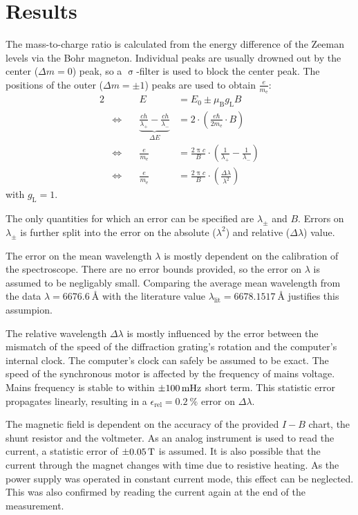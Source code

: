 \chapter{Results}
The mass-to-charge ratio is calculated from the energy difference of the Zeeman levels via the Bohr magneton.
Individual peaks are usually drowned out by the center ($\Delta m = 0$) peak, so a $\upsigma$-filter is used to block the center peak.
The positions of the outer ($\Delta m = \pm 1$) peaks are used to obtain $\frac{e}{m_\text{e}}$:
\begin{alignat}{2}
	& &E &= E_0 \pm \mu_\text{B} g_\text{L} B\\
	&\Leftrightarrow \quad &\underbrace{\frac{c h}{\lambda_+} - \frac{c h}{\lambda_-}}_{\Delta E} &=
	2 \cdot \left(\frac{e \hbar}{2 m_\text{e}} \cdot B \right)\\
	&\Leftrightarrow &\frac{e}{m_\text{e}} &= \frac{2 \uppi c}{B} \cdot \left(\frac{1}{\lambda_+} - \frac{1}{\lambda_-}\right)\\
	&\Leftrightarrow &\frac{e}{m_\text{e}} &= \frac{2 \uppi c}{B} \cdot \left(\frac{\Delta \lambda}{\lambda^2}\right)	\label{eq:eoverm}
\end{alignat}
with $g_\text{L} = 1$.

The only quantities for which an error can be specified are $\lambda_\pm$ and $B$.
Errors on $\lambda_\pm$ is further split into the error on the absolute ($\lambda^2$) and relative ($\Delta \lambda$) value.

The error on the mean wavelength $\lambda$ is mostly dependent on the calibration of the spectroscope.
There are no error bounds provided, so the error on $\lambda$ is assumed to be negligably small.
Comparing the average mean wavelength from the data $\lambda = \SI{6676.6}{\angstrom}$ with the literature value $\lambda_\text{lit} = \SI{6678.1517}{\angstrom}$ justifies this assumpion.

The relative wavelength $\Delta \lambda$ is mostly influenced by the error between the mismatch of the speed of the diffraction grating's rotation and the computer's internal clock.
The computer's clock can safely be assumed to be exact.
The speed of the synchronous motor is affected by the frequency of mains voltage.
Mains frequency is stable to within $\SI{\pm 100}{\milli\hertz}$ short term.
This statistic error propagates linearly, resulting in a $\epsilon_\text{rel} = \SI{0.2}{\percent}$ error on $\Delta\lambda$.

The magnetic field is dependent on the accuracy of the provided $I-B$ chart, the shunt resistor and the voltmeter.
As an analog instrument is used to read the current, a statistic error of $\SI{\pm 0.05}{\tesla}$ is assumed.
It is also possible that the current through the magnet changes with time due to resistive heating.
As the power supply was operated in constant current mode, this effect can be neglected.
This was also confirmed by reading the current again at the end of the measurement.

